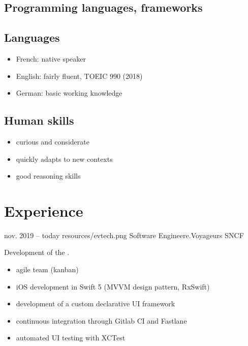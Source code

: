 \documentclass{cv}
\begin{document}
\noindent%
\begin{minipage}[t]{0.4\textwidth}
	\subsection{Programming languages, frameworks}
	\begin{center}
		  
		  
		 
		  
		  
	\end{center}
\end{minipage}\hfill%
\begin{minipage}[t]{0.5\textwidth}
	\subsection{Languages}
	\begin{itemize}
		\item French: native speaker
		\item English: fairly fluent, TOEIC 990 (2018)
		\item German: basic working knowledge
	\end{itemize}
	
	\subsection{Human skills}
	\begin{itemize}
		\item curious and considerate
		\item quickly adapts to new contexts
		\item good reasoning skills
	\end{itemize}
\end{minipage}


\section{Experience}

\experience
{{nov. 2019 -- today}}
{resources/evtech.png}
{Software Engineer}{e.Voyageurs SNCF}{

Development of the \href{https://apps.apple.com/fr/app/oui-sncf-train-et-bus/id343889987}{}. 

\begin{itemize}
	\item agile team (kanban)
	\item iOS development in Swift 5 (MVVM design pattern, RxSwift)
	\item development of a custom declarative UI framework
	\item continuous integration through Gitlab CI and Fastlane
	\item automated UI testing with XCTest
\end{itemize}
}
\end{document}
